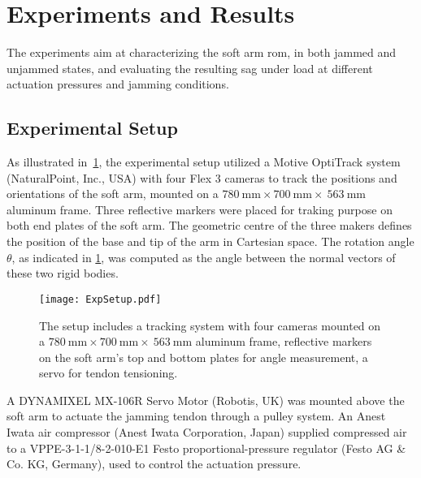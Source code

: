 

\section{Experiments and Results}
\label{sec:exp_descr}

The experiments aim at 
characterizing the soft arm \gls{rom}, in both jammed and unjammed states, and evaluating the resulting sag %
under load at different actuation pressures and jamming conditions. 

\subsection{Experimental Setup}
\label{sec:setup}

As illustrated in~\cref{fig:setup}, the experimental setup utilized a Motive OptiTrack\textsuperscript{\texttrademark} system (NaturalPoint, Inc., USA) with four Flex 3 cameras to track the positions and orientations of the soft arm, mounted on a $780\ \mathrm{mm} \times 700\ \mathrm{mm} \times \ 563\ \mathrm{mm}$ aluminum frame. 
Three reflective markers were placed for traking purpose on both end plates of the soft arm.
The geometric centre of the three makers defines the position of the base and tip of the arm in Cartesian space.
The rotation angle $\theta$, as indicated in \cref{fig:setup}, was computed as the angle between the normal vectors of these two rigid bodies. 

\begin{figure}
    \centering
    \texttt{[image: ExpSetup.pdf]}
    \caption{The setup includes a tracking system with four cameras mounted on a $780\ \mathrm{mm} \times 700\ \mathrm{mm} \times \ 563\ \mathrm{mm}$ aluminum frame, reflective markers on the soft arm’s top and bottom plates for angle measurement, a servo for tendon tensioning.}
    \label{fig:setup}
\end{figure}

A DYNAMIXEL MX-106R Servo Motor \textsuperscript{\textregistered} (Robotis, UK) was mounted above the soft arm to actuate the jamming tendon through a pulley system. An Anest Iwata\textsuperscript{\textregistered} air compressor (Anest Iwata Corporation, Japan) supplied compressed air to a VPPE-3-1-1/8-2-010-E1 Festo\textsuperscript{\textregistered} proportional-pressure regulator (Festo AG \& Co. KG, Germany), used to control the actuation pressure.


